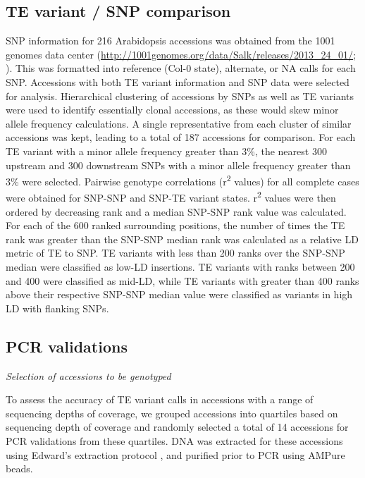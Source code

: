 \documentclass[12pt]{article}
\begin{document}
\subsection{TE variant / SNP comparison}

SNP information for 216 Arabidopsis accessions was obtained from the
1001 genomes data center
(\url{http://1001genomes.org/data/Salk/releases/2013_24_01/};
\cite{Schmitz:2013iu}). This was formatted into reference (Col-0
state), alternate, or NA calls for each SNP. Accessions with both TE
variant information and SNP data were selected for
analysis. Hierarchical clustering of accessions by SNPs as well as TE
variants were used to identify essentially clonal accessions, as these
would skew minor allele frequency calculations. A single
representative from each cluster of similar accessions was kept,
leading to a total of 187 accessions for comparison. For each TE
variant with a minor allele frequency greater than 3\%, the nearest
300 upstream and 300 downstream SNPs with a minor allele frequency
greater than 3\% were selected. Pairwise genotype correlations
(r\textsuperscript{2} values) for all complete cases were obtained for
SNP-SNP and SNP-TE variant states. r\textsuperscript{2} values were
then ordered by decreasing rank and a median SNP-SNP rank value was
calculated. For each of the 600 ranked surrounding positions, the
number of times the TE rank was greater than the SNP-SNP median rank
was calculated as a relative LD metric of TE to SNP. TE variants with
less than 200 ranks over the SNP-SNP median were classified as low-LD
insertions. TE variants with ranks between 200 and 400 were classified
as mid-LD, while TE variants with greater than 400 ranks above their
respective SNP-SNP median value were classified as variants in high LD
with flanking SNPs.

\subsection{PCR validations}

\emph{Selection of accessions to be genotyped}

To assess the accuracy of TE variant calls in accessions with a range of
sequencing depths of coverage, we grouped accessions into quartiles
based on sequencing depth of coverage and randomly selected a total of
14 accessions for PCR validations from these quartiles. DNA was
extracted for these accessions using Edward's extraction protocol
\cite{Edwards:1991wp}, and purified prior to PCR using AMPure beads.
\end{document}
